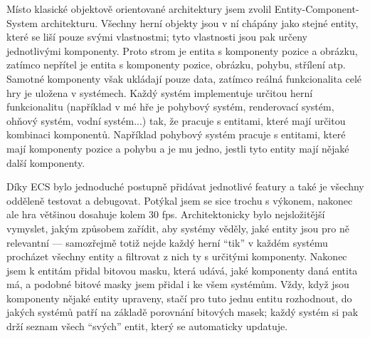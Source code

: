 \documentclass[BCOR=0pt]{scrartcl}
\begin{document}
Místo klasické objektově orientované architektury jsem zvolil Entity-Component-System architekturu. Všechny herní objekty jsou v ní chápány jako stejné entity, které se liší pouze svými vlastnostmi; tyto vlastnosti jsou pak určeny jednotlivými komponenty. Proto strom je entita s komponenty pozice a obrázku, zatímco nepřítel je entita s komponenty pozice, obrázku, pohybu, střílení atp. Samotné komponenty však ukládají pouze data, zatímco reálná funkcionalita celé hry je uložena v systémech. Každý systém implementuje určitou herní funkcionalitu (například v mé hře je pohybový systém, renderovací systém, ohňový systém, vodní systém...) tak, že pracuje s entitami, které mají určitou kombinaci komponentů. Například pohybový systém pracuje s entitami, které mají komponenty pozice a pohybu a je mu jedno, jestli tyto entity mají nějaké další komponenty.

Díky ECS bylo jednoduché postupně přidávat jednotlivé featury a také je všechny odděleně testovat a debugovat. Potýkal jsem se sice trochu s výkonem, nakonec ale hra většinou dosahuje kolem 30 fps. Architektonicky bylo nejsložitější vymyslet, jakým způsobem zařídit, aby systémy věděly, jaké entity jsou pro ně relevantní --- samozřejmě totiž nejde každý herní ``tik'' v každém systému procházet všechny entity a filtrovat z nich ty s určitými komponenty. Nakonec jsem k entitám přidal bitovou masku, která udává, jaké komponenty daná entita má, a podobné bitové masky jsem přidal i ke všem systémům. Vždy, když jsou komponenty nějaké entity upraveny, stačí pro tuto jednu entitu rozhodnout, do jakých systémů patří na základě porovnání bitových masek; každý systém si pak drží seznam všech ``svých'' entit, který se automaticky updatuje.
\end{document}
